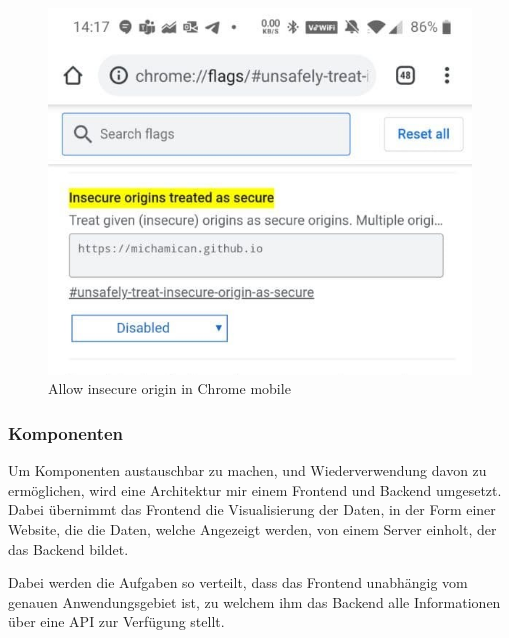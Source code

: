 \begin{figure}
	\centering
	\includegraphics[width=.75\linewidth]{images/InsecureOriginsSettings}
	\caption{Allow insecure origin in Chrome mobile}
	\label{fig:insecureOriginsSettings}
\end{figure}

%	


\subsubsection{Komponenten}
\label{section:Komponenten}

Um Komponenten austauschbar zu machen, und Wiederverwendung davon zu
ermöglichen, wird eine Architektur mir einem Frontend und Backend
umgesetzt. Dabei übernimmt das Frontend die Visualisierung der Daten,
in der Form einer Website, die die Daten, welche Angezeigt werden,
von einem Server einholt, der das Backend bildet.

Dabei werden die Aufgaben so verteilt, dass das Frontend unabhängig
vom genauen Anwendungsgebiet ist, zu welchem ihm das Backend alle
Informationen über eine API zur Verfügung stellt.

